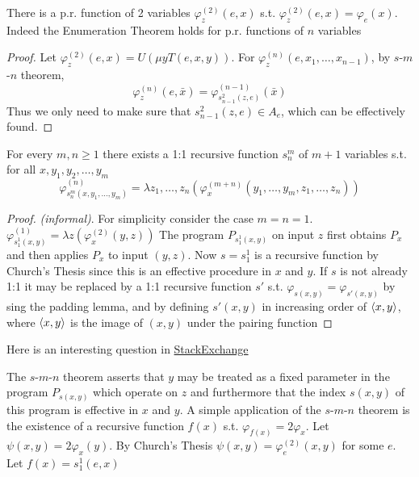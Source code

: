 \documentclass[11pt]{article}
\begin{document}
\begin{theorem}
\label{thm3.4}
There is a p.r. function of 2 variables \(\varphi_z^{(2)}(e,x)\) s.t.
\(\varphi_z^{(2)}(e,x)=\varphi_e(x)\). Indeed the Enumeration Theorem holds for
p.r. functions of \(n\) variables
\end{theorem}
\begin{proof}
Let \(\varphi_z^{(2)}(e,x)=U(\mu y T(e,x,y))\). For
\(\varphi_z^{(n)}(e,x_1,\dots,x_{n-1})\), by \(s\)-\(m\)-\(n\) theorem, 
\begin{equation*}
\varphi_z^{(n)}(e,\bar{x})=
\varphi_{s^2_{n-1}(z,e)}^{(n-1)}(\bar{x})
\end{equation*}
Thus we only need to make sure that \(s^2_{n-1}(z,e)\in A_e\), which can be
effectively found.
\end{proof}
\begin{theorem}
For every \(m,n\ge 1\) there exists a 1:1 recursive function \(s^m_n\) of \(m+1\)
variables s.t. for all \(x,y_1,y_2,\dots,y_m\)
\begin{equation*}
\varphi_{s^m_n(x,y_1,\dots,y_m)}^{(n)}=\lambda z_1,\dots,z_n
(\varphi_x^{(m+n)}(y_1,\dots,y_m,z_1,\dots,z_n))
\end{equation*}
\end{theorem}
\begin{proof}
\emph{(informal)}. For simplicity consider the case \(m=n=1\).
\(\varphi^{(1)}_{s^1_1(x,y)}=\lambda z(\varphi_x^{(2)}(y,z))\)
The program
\(P_{s_1^1(x,y)}\) on input \(z\) first obtains \(P_x\) and then applies \(P_x\) to
input \((y,z)\). Now \(s=s_1^1\) is a recursive function by Church's Thesis
since this is an effective procedure in \(x\) and \(y\). If \(s\) is not
already 1:1 it may be replaced by a 1:1 recursive function \(s'\) s.t.
\(\varphi_{s(x,y)}=\varphi_{s'(x,y)}\) by sing the padding lemma, and by
defining \(s'(x,y)\) in increasing order of \(\langle x,y\rangle\), where
\(\langle x,y\rangle\) is the image of \((x,y)\) under the pairing function
\end{proof}

\begin{remark}
Here is an interesting question in \href{https://cs.stackexchange.com/questions/80837/is-smn-theorem-the-same-concept-as-currying}{StackExchange}
\end{remark}

The \(s\)-\(m\)-\(n\) theorem asserts that \(y\) may be treated as a fixed parameter
in the program \(P_{s(x,y)}\) which operate on \(z\) and furthermore that the
index \(s(x,y)\) of this program is effective in \(x\) and \(y\). A simple
application of the \(s\)-\(m\)-\(n\) theorem is the existence of a recursive
function \(f(x)\) s.t. \(\varphi_{f(x)}=2\varphi_x\). Let
\(\psi(x,y)=2\varphi_x(y)\). By Church's Thesis
\(\psi(x,y)=\varphi_e^{(2)}(x,y)\) for some \(e\). Let \(f(x)=s^1_1(e,x)\)
\end{document}
